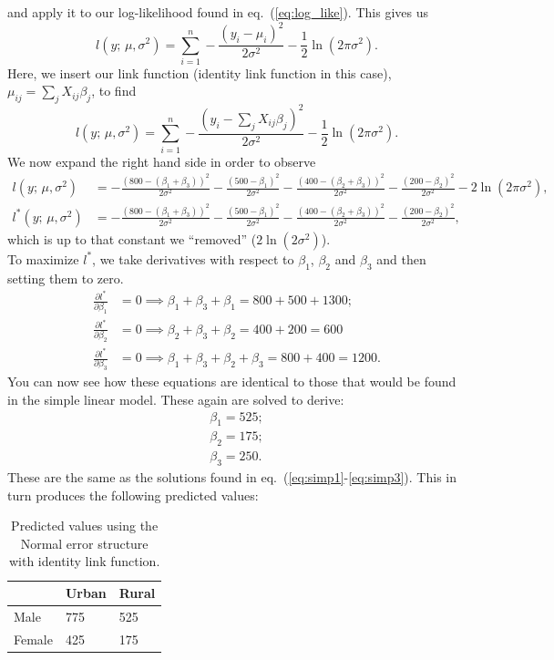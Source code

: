 \documentclass{article}
\begin{document}
and apply it to our log-likelihood found in eq.~(\ref{eq:log_like}). This gives us
\begin{equation}
    l(y;\,\mu,\sigma^2) = \sum_{i=1}^n -\frac{(y_i-\mu_i)^2}{2\sigma^2}-\frac{1}{2}\ln{(2\pi\sigma^2)}.
\end{equation}
Here, we insert our link function (identity link function in this case), $\mu_{ij}=\sum_jX_{ij}\beta_j$, to find
\begin{equation}
    l(y;\,\mu,\sigma^2) = \sum_{i=1}^n -\frac{\left(y_i-\sum_j X_{ij}\beta_j\right)^2}{2\sigma^2}-\frac{1}{2}\ln{(2\pi\sigma^2)}.
\end{equation}
We now expand the right hand side in order to observe
\begin{align}
    l(y;\,\mu,\sigma^2) &= -\frac{(800-(\beta_1+\beta_3))^2}{2\sigma^2} -\frac{(500-\beta_1)^2}{2\sigma^2}-\frac{(400-(\beta_2+\beta_3))^2}{2\sigma^2}-\frac{(200-\beta_2)^2}{2\sigma^2} - 2\ln(2\pi\sigma^2), \\
    l^*(y;\,\mu,\sigma^2) &= -\frac{(800-(\beta_1+\beta_3))^2}{2\sigma^2} -\frac{(500-\beta_1)^2}{2\sigma^2}-\frac{(400-(\beta_2+\beta_3))^2}{2\sigma^2}-\frac{(200-\beta_2)^2}{2\sigma^2},
\end{align}
which is up to that constant we ``removed'' ($2\ln(2\sigma^2)$).\\
To maximize $l^*$, we take derivatives with respect to $\beta_1$, $\beta_2$ and $\beta_3$ and then setting them to zero.
\begin{align}
    \frac{\partial l^*}{\partial \beta_1} &= 0 \implies \beta_1 + \beta_3 + \beta_1 = 800+500+1300; \\
    \frac{\partial l^*}{\partial \beta_2} &= 0 \implies \beta_2 + \beta_3 + \beta_2 = 400 + 200 = 600\\
    \frac{\partial l^*}{\partial \beta_3} &= 0 \implies \beta_1 + \beta_3 + \beta_2 + \beta_3 = 800+400 = 1200.
\end{align}
You can now see how these equations are identical to those that would be found in the simple linear model. These again are solved to derive:
\begin{align}
    \beta_1 = 525; \\
    \beta_2 = 175; \\
    \beta_3 = 250.
\end{align}
These are the same as the solutions found in eq.~(\ref{eq:simp1}-\ref{eq:simp3}). This in turn produces the following predicted values:
\begin{table}[H]
\centering
\begin{tabular}{l|l|l|}
\cline{2-3}
                             & Urban & Rural \\ \hline
\multicolumn{1}{|l|}{Male}   & 775   & 525   \\ \hline
\multicolumn{1}{|l|}{Female} & 425   & 175   \\ \hline
\end{tabular}
    \caption{Predicted values using the Normal error structure with identity link function.}
    \label{fig:covariances_example_1}
\end{table}
\end{document}

